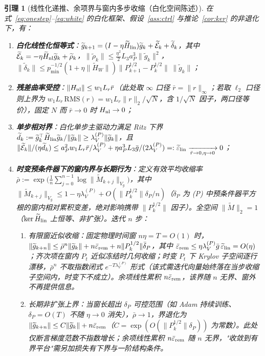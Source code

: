 \documentclass[fontset=windows,11pt]{ctexart}
\newcommand{\W}{W}
\newcommand{\Erem}{\mathcal E}
\newcommand{\wt}[1]{\widetilde{#1}}
\newtheorem{lemma}{引理}[section]
\numberwithin{equation}{section}
\begin{document}
\begin{lemma}[线性化递推、余项界与窗内多步收缩（白化空间陈述）]\label{lem:linrec}
在式~\eqref{eq:onestep}--\eqref{eq:white} 的白化框架、假设~\ref{ass:ctrl} 与推论~\ref{cor:ker} 的非退化下，有：
\begin{enumerate}[label=(\roman*),leftmargin=2.4em,itemsep=3pt]
\item \textbf{白化线性化恒等式}：$\wt g_{k+1}=(I-\eta\wt H_{\rm lin})\wt g_k+\wt\Erem_k+\wt\delta_k$，其中 $\wt\Erem_k=-\eta\wt H_{\rm nl}\wt g_k+\wt\rho_k$，$\|\wt\rho_k\|\le\tfrac{\eta^2}{2}L_3a_P^3\|\wt g_k\|^2$，$\|\wt\delta_k\|\le p_{\min}^{-1/2}(1+\eta\|\wt H_{\W}\|)\|P_{k+1}^{1/2}-P_k^{1/2}\|\,\|\wt g_k\|$；
\item \textbf{残差曲率受控}：$\|H_{\rm nl}\|\le w_1L_r\bar r$（此处取 $\infty$ 口径 $\bar r=\|r\|_\infty$；若取 $\ell_2$ 口径则上界为 $w_1L_r\,\mathrm{RMS}(r)=w_1L_r\|r\|_2/\sqrt N$，含 $1/\sqrt N$ 因子，两口径等价），固定 $N$ 而 $\bar r\to0$ 时 $H_{\rm nl}\to0$；
\item \textbf{单步相对界}：白化单步主驱动力满足 Ritz 下界 $\wt d_k:=\wt g_k^\top\wt H_{\rm lin}\wt g_k/\|\wt g_k\|\ge\lambda_V^{(P)}\|\wt g_k\|$，且 $\|\wt\Erem_k\|/(\eta\wt d_k)\le a_P^2w_1L_r\bar r/\lambda_V^{(P)}+\eta a_P^3L_3\bar g/(2\lambda_V^{(P)})=:\wt\varepsilon_{\rm lin}\xrightarrow[\bar r\to0,\eta\to0]{}0$；
\item \textbf{时变预条件器下的窗内界与长期行为}：定义有效平均收缩率 $\bar\rho:=\exp\!\bigl(\tfrac1n\sum_{j=0}^{n-1}\log\|\wt M_{k+j}\|_{V_g}\bigr)$，其中 $\|\wt M_{k+j}\|_{V_g}\le 1-\eta\lambda_V^{(P)}+O(\|P_k^{1/2}\|\delta_P/n)$（$\delta_P$ 为 (P) 中预条件器平方根的窗内\emph{相对}累积变差，绝对影响携带 $\|P_k^{1/2}\|$ 因子）。\emph{全空间} $\|\wt M\|_2=1$（$\ker\wt H_{\rm lin}$ 上恒等、非扩张）。迭代 $n$ 步：
  \begin{enumerate}[label=(\alph*),leftmargin=2em,itemsep=1pt]
  \item \emph{有限窗近似收缩}：固定物理时间窗 $n\eta=T=O(1)$ 时，$\|\wt g_{k+n}\|\le\bar\rho^n\|\wt g_k\|+n\bar\varepsilon_{\rm rem}+n\|P_k^{1/2}\|\bar\delta_P$，其中 $\bar\varepsilon_{\rm rem}\le\eta\lambda_V^{(P)}\bar g\,\wt\varepsilon_{\rm lin}=O(\eta)$；齐次项在窗内 $P_t$ 近似冻结时几何收缩；时变 $P_t$ 下 Krylov 子空间逐行漂移，$\bar\rho^n$ 不取指数闭式 $e^{-T\lambda_V^{(P)}}$ 形式（该式需迭代向量始终落在当步收缩子空间内，时变下不成立）。余项线性累积 $n\bar\varepsilon_{\rm rem}$，该界随 $n$ 无界、窗外不再提供信息。
  \item \emph{长期非扩张上界}：当窗长超出 $\delta_P$ 可控范围（如 Adam 持续训练、$\delta_P=O(T)$ 不随 $\eta\to0$ 消失），$\bar\rho\to1$，界退化为 $\|\wt g_{k+n}\|\le C\|\wt g_k\|+n\bar\varepsilon_{\rm rem}$（$C=\exp(O(\|P_k^{1/2}\|\delta_P))$ 为常数）。此处仅断言梯度范数不指数增长；余项线性累积 $n\bar\varepsilon_{\rm rem}$ 随 $n$ 无界，"收敛到有界平台"需另加损失有下界与一阶结构条件。

\end{enumerate}
\end{enumerate}
\end{lemma}
\end{document}

